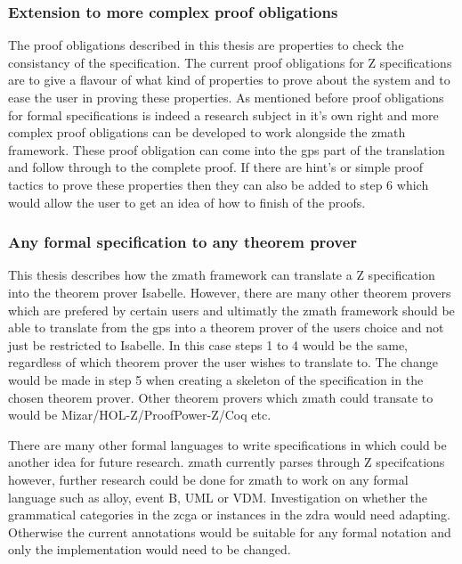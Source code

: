 \subsubsection{Extension to more complex proof obligations}

The proof obligations described in this thesis are properties to check the consistancy of the specification. The current proof obligations for Z specifications are to give a flavour of what kind of properties to prove about the system and to ease the user in proving these properties. As mentioned before proof obligations for formal specifications is indeed a research subject in it's own right and more complex proof obligations can be developed to work alongside the \gls{zmath} framework. These proof obligation can come into the \gls{gps} part of the translation and follow through to the complete proof. If there are hint's or simple proof tactics to prove these properties then they can also be added to step 6 which would allow the user to get an idea of how to finish of the proofs.

\subsubsection{Any formal specification to any theorem prover}

This thesis describes how the \gls{zmath} framework can translate a Z specification into the theorem prover Isabelle. However, there are many other theorem provers which are prefered by certain users and ultimatly the \gls{zmath} framework should be able to translate from the \gls{gps} into a theorem prover of the users choice and not just be restricted to Isabelle. In this case steps 1 to 4 would be the same, regardless of which theorem prover the user wishes to translate to. The change would be made in step 5 when creating a skeleton of the specification in the chosen theorem prover. Other theorem provers which \gls{zmath} could transate to would be Mizar/HOL-Z/ProofPower-Z/Coq etc.

There are many other formal languages to write specifications in which could be another idea for future research. \Gls{zmath} currently parses through Z specifcations however, further research could be done for \gls{zmath} to work on any formal language such as alloy, event B, UML or VDM. Investigation on whether the grammatical categories in the \gls{zcga} or instances in the \gls{zdra} would need adapting. Otherwise the current annotations would be suitable for any formal notation and only the implementation would need to be changed.


